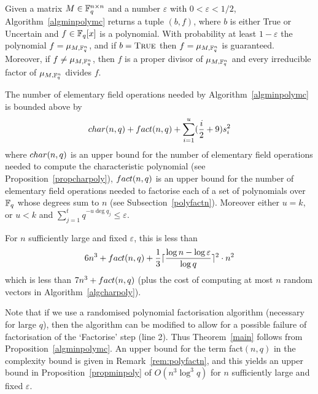 \begin{Prop}\label{propminpoly}

\mbox{}\par
Given a matrix $M \in \mathbb{F}_q^{n \times n}$ and a number
$\varepsilon$ with $0 < \varepsilon < 1/2$, Algorithm~\ref{algminpolymc}
returns a tuple $(b,f)$, where $b$ is either {\sc True} or {\sc Uncertain}
and $f \in \mathbb{F}_q[x]$ is a polynomial. With probability at least $1-\varepsilon$
the polynomial $f=\mu_{M,\mathbb{F}_q^n}$, and if
\/ $b = \mbox{\sc True}$ then
$f = \mu_{M,\mathbb{F}_q^n}$ is guaranteed. Moreover, 
if\/ $f \ne \mu_{M,\mathbb{F}_q^n}$, then 
$f$ is a proper divisor of $\mu_{M,\mathbb{F}_q^n}$ and
every irreducible factor of $\mu_{M,\mathbb{F}_q^n}$ divides $f$.

The number of elementary field operations needed by 
Algorithm~\ref{algminpolymc} is bounded above by
\[ 
{\rm char}(n,q) + {\rm fact}(n,q) + 
  \sum_{i=1}^u (\frac{i}{2}+9)s_i^2
\]
where ${\rm char}(n,q)$ is an upper bound for the number of elementary field operations needed to
compute the characteristic polynomial (see
Proposition~\ref{propcharpoly}), ${\rm fact}(n,q)$ is an upper bound for 
the number of elementary field
operations needed to factorise each of a set of polynomials over $\mathbb{F}_q$ whose degrees sum to $n$
(see Subsection~{\rm\ref{polyfactn}}). Moreover either $u=k$, or $u<k$ and
$\sum_{j=1}^t q^{-u\deg q_j} \le \varepsilon$.

For $n$ sufficiently large and fixed $\varepsilon$, this is less than
\[ 6n^3 + {\rm fact}(n,q) + 
\frac{1}{3} \lceil\frac{\log n-\log \varepsilon}{\log q}\rceil^2 \cdot n^2 
\]
which is less than $7n^3 + {\rm fact}(n,q)$ (plus the cost of computing at most $n$ random 
vectors in Algorithm~\ref{algcharpoly}).
\end{Prop}


\begin{Rem}
Note that if we use a randomised polynomial factorisation algorithm
(necessary for large $q$), then the algorithm can be modified to allow
for a possible failure of factorisation of the `Factorise' step (line
2). Thus Theorem~\ref{main} follows from Proposition~\ref{algminpolymc}.
An upper bound for the term {\rm fact}$(n,q)$ in the complexity
bound is given in Remark~{\rm\ref{rem:polyfactn}}, and this yields an
upper bound in Proposition~{\rm\ref{propminpoly}} of $O(n^3\log^3 q)$
for $n$ sufficiently large and fixed $\varepsilon$.
\end{Rem}


